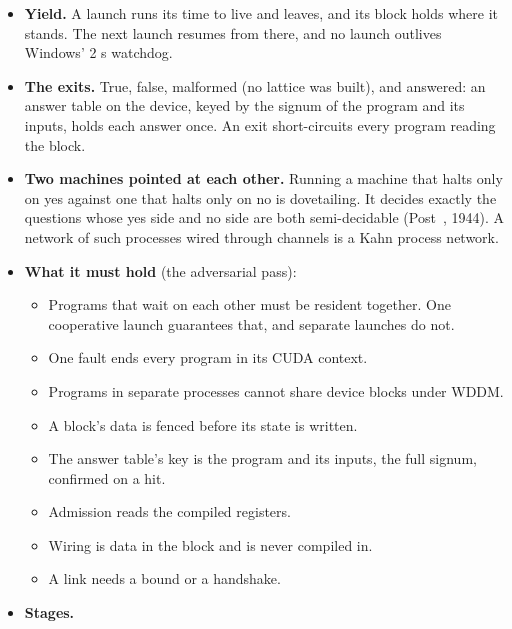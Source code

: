 \begin{enumerate}
\begin{itemize}
\begin{itemize}
\item the program's signum, the run's generation, and the launch that owns it;
\item the scheduler's command (run, yield, stop) and the grant: registers a thread, threads, device bytes (the local frame times the threads) and shared bytes (\texttt{engine\_\allowbreak{}config.\allowbreak{}h});
\item the state, the exits, and the error's module and site;
\item the check-ins, and the progress: lanes and refusals;
\item the wiring: the blocks it reads and the blocks that read it, each link's words produced and consumed, the result, and the parent;
\item a CRC-64 that seals the block whenever no launch holds it.
\end{itemize}
\item \textbf{Yield.} A launch runs its time to live and leaves, and its block holds where it stands. The next launch resumes from there, and no launch outlives Windows' 2 s watchdog.
\item \textbf{The exits.} True, false, malformed (no lattice was built), and answered: an answer table on the device, keyed by the signum of the program and its inputs, holds each answer once. An exit short-circuits every program reading the block.
\item \textbf{Two machines pointed at each other.} Running a machine that halts only on yes against one that halts only on no is dovetailing. It decides exactly the questions whose yes side and no side are both semi-decidable (Post~\cite{src:Post-1944}, 1944). A network of such processes wired through channels is a Kahn process network.
\item \textbf{What it must hold} (the adversarial pass):

\begin{itemize}
\item Programs that wait on each other must be resident together. One cooperative launch guarantees that, and separate launches do not.
\item One fault ends every program in its CUDA context.
\item Programs in separate processes cannot share device blocks under WDDM.
\item A block's data is fenced before its state is written.
\item The answer table's key is the program and its inputs, the full signum, confirmed on a hit.
\item Admission reads the compiled registers.
\item Wiring is data in the block and is never compiled in.
\item A link needs a bound or a handshake.
\end{itemize}
\item \textbf{Stages.}


\end{itemize}
\end{enumerate}
